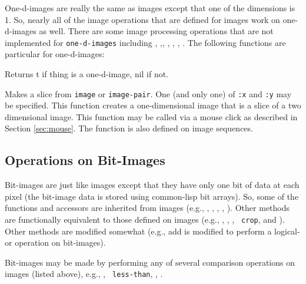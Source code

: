 One-d-images are really the same as images except that one of the
dimensions is 1.  So, nearly all of the image operations that are
defined for images work on one-d-images as well.  There are some image
processing operations that are not implemented for {\tt one-d-images}
including , ,, ,
, , .  The following
functions are particular for one-d-images:
\begin{description}
\item{}
Returns t if thing is a one-d-image, nil if not.

\item{}
Makes a slice from {\tt image} or {\tt image-pair}.  One (and only
one) of {\tt :x} and {\tt :y} may be specified.  This
function creates a one-dimensional image that is a slice of a two
dimensional image.  This function may be called via a mouse click as
described in Section \ref{sec:mouse}.  The function is also defined on
image sequences.
\end{description}


\subsection{Operations on Bit-Images}

Bit-images are just like images except that they have only one bit of
data at each pixel (the bit-image data is stored using common-lisp bit
arrays).  So, some of the functions and accessors are inherited from
images (e.g., , , , ,
).  Other methods are functionally equivalent to those
defined on images (e.g., , , , {\tt
crop}, and ).  Other methods are modified somewhat (e.g.,
add is modified to perform a logical-or operation on bit-images).  

Bit-images may be made by performing any of several comparison
operations on images (listed above), e.g., , {\tt
less-than}, , .

